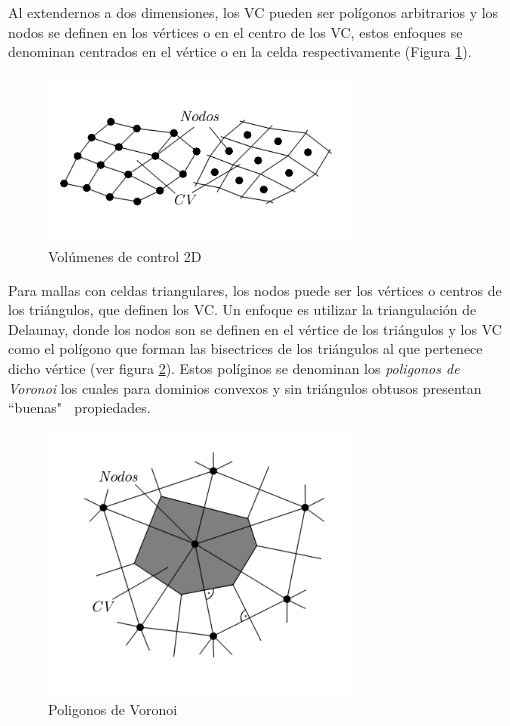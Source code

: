 \documentclass[a4paper,10pt, oneside]{book}
\begin{document}
Al extendernos a dos dimensiones, los VC pueden ser polígonos arbitrarios y los nodos se definen en los vértices o en el centro de los VC, estos enfoques se denominan centrados en el vértice o en la celda respectivamente (Figura \ref{img:4-2}). 
\begin{figure}[h!]
	\centering
	\includegraphics[width=8cm]{Img/4-2}
	\caption{Volúmenes de control 2D}
	\label{img:4-2}
\end{figure}
Para mallas con celdas triangulares, los nodos puede ser los vértices o centros de los triángulos, que definen los VC. Un enfoque es utilizar la triangulación de Delaunay, donde los nodos son se definen en el vértice de los triángulos y los VC como el polígono que forman las bisectrices de los triángulos al que pertenece dicho vértice (ver figura \ref{img:4-3}). Estos políginos se denominan los \textit{poligonos de Voronoi} los cuales para dominios convexos y sin triángulos obtusos presentan ``buenas" $~$ propiedades. 
\begin{figure}[h!]
	\centering
	\includegraphics[width=8cm]{Img/4-3}
	\caption{Poligonos de Voronoi}
	\label{img:4-3}
\end{figure}

\pagebreak 
\end{document}
